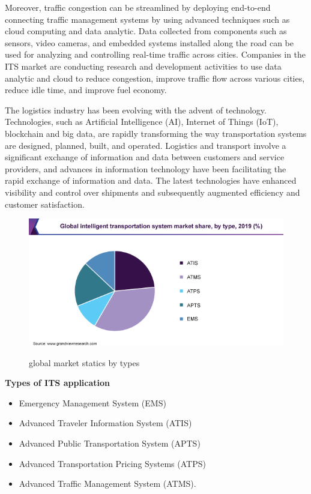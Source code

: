 Moreover, traffic congestion can be streamlined by deploying end-to-end connecting traffic management systems by using advanced techniques such as cloud computing and data analytic. Data collected from components such as sensors, video cameras, and embedded systems installed along the road can be used for analyzing and controlling real-time traffic across cities. Companies in the ITS market are conducting research and development activities to use data analytic and cloud to reduce congestion, improve traffic flow across various cities, reduce idle time, and improve fuel economy.

The logistics industry has been evolving with the advent of technology. Technologies, such as Artificial Intelligence (AI), Internet of Things (IoT), blockchain and big data, are rapidly transforming the way transportation systems are designed, planned, built, and operated. Logistics and transport involve a significant exchange of information and data between customers and service providers, and advances in information technology have been facilitating the rapid exchange of information and data. The latest technologies have enhanced visibility and control over shipments and subsequently augmented efficiency and customer satisfaction.

\begin{figure}[htp]%
    \center%
    \includegraphics[width=1\textwidth]{images/ch1/global-market.png}%
    \caption[global market statics by types]{global market statics by types}\cite{web003}\label{fig: global market by types}%
  \end{figure}
  
 \textbf{Types of ITS application}
\begin{itemize}
\item Emergency Management System (EMS)
\item Advanced Traveler Information System (ATIS) 
\item Advanced Public Transportation System (APTS)
\item Advanced Transportation Pricing Systems (ATPS)
\item Advanced Traffic Management System (ATMS).
\end{itemize}
  

